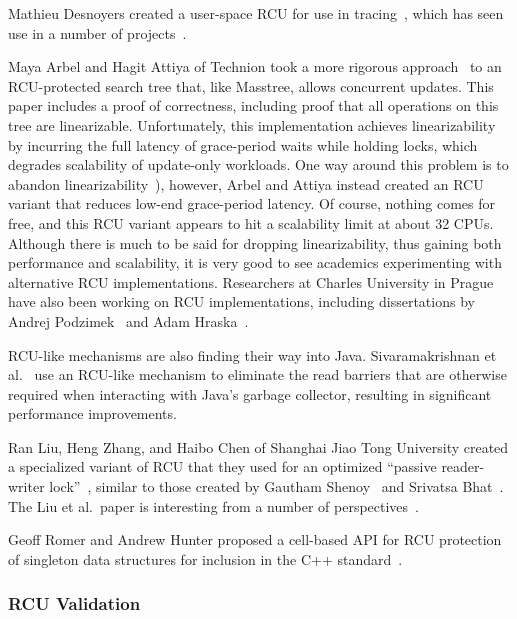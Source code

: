 Mathieu Desnoyers created a user-space RCU for use in
tracing~\cite{MathieuDesnoyersPhD,MathieuDesnoyers2012URCU},
which has seen use in a number of projects~\cite{MikeDay2013RCUqemu}.

Maya Arbel and Hagit Attiya of Technion took a more rigorous
approach~\cite{MayaArbel2014RCUtree} to an RCU-protected search tree that,
like Masstree, allows concurrent updates.
This paper includes a proof of correctness, including proof that all
operations on this tree are linearizable.
Unfortunately, this implementation achieves linearizability by incurring
the full latency of grace-period waits while holding locks, which degrades
scalability of update-only workloads.
One way around this problem is to abandon
linearizability~\cite{AndreasHaas2012FIFOisnt,PaulEMcKennneyAtomicTreeN4037}),
however, Arbel and Attiya instead created an RCU variant that reduces
low-end grace-period latency.
Of course, nothing comes for free, and this RCU variant appears to hit
a scalability limit at about 32 CPUs.
Although there is much to be said for dropping linearizability, thus
gaining both performance and scalability, it is very good to see academics
experimenting with alternative RCU implementations.
Researchers at Charles University in Prague have also been
working on RCU implementations, including dissertations by
Andrej Podzimek~\cite{AndrejPodzimek2010masters} and Adam
Hraska~\cite{AdamHraska2013RCUHelenOS}.

RCU-like mechanisms are also finding their way into Java.
Sivaramakrishnan et al.~\cite{Sivaramakrishnan:2012:ERB:2258996.2259005}
use an RCU-like mechanism to eliminate the read barriers that are
otherwise required when interacting with Java's garbage collector,
resulting in significant performance improvements.

Ran Liu, Heng Zhang, and Haibo Chen of Shanghai Jiao Tong University
created a specialized variant of RCU that they used for an optimized
``passive reader-writer lock''~\cite{RanLiu2014PassiveRWLock}, similar to
those created by Gautham Shenoy~\cite{GauthamShenoy2006RCUrwlock} and
Srivatsa Bhat~\cite{SrivatsaSBhat2014RCUrwlock}.
The Liu et al.~paper is interesting from a number of
perspectives~\cite{PaulEMcKenney2014ReadMostly}.

Geoff Romer and Andrew Hunter proposed a cell-based API for RCU
protection of singleton data structures for inclusion in the
C++ standard~\cite{GeoffRomer2017C++DeferredReclamation}.

\subsubsection{RCU Validation}
\label{sec:defer:RCU Validation}

